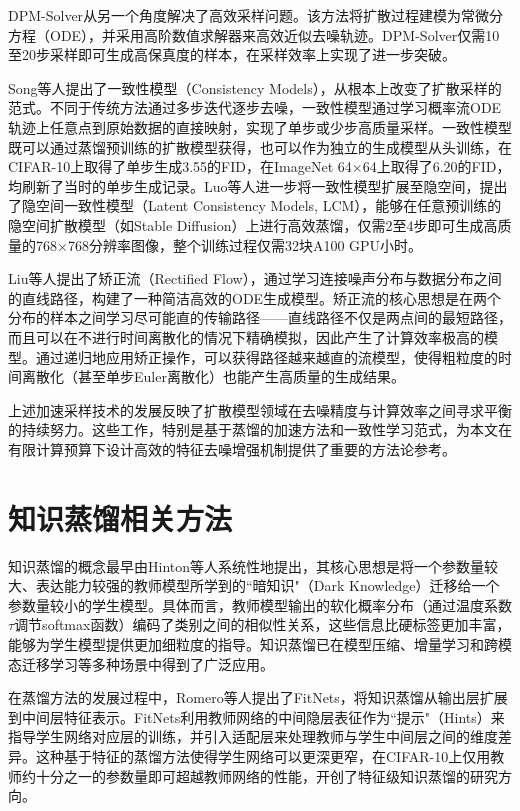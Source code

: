 DPM-Solver\cite{lu2022dpm}从另一个角度解决了高效采样问题。该方法将扩散过程建模为常微分方程（ODE），并采用高阶数值求解器来高效近似去噪轨迹。DPM-Solver仅需10至20步采样即可生成高保真度的样本，在采样效率上实现了进一步突破。

Song等人\cite{song2023consistency}提出了一致性模型（Consistency Models），从根本上改变了扩散采样的范式。不同于传统方法通过多步迭代逐步去噪，一致性模型通过学习概率流ODE轨迹上任意点到原始数据的直接映射，实现了单步或少步高质量采样。一致性模型既可以通过蒸馏预训练的扩散模型获得，也可以作为独立的生成模型从头训练，在CIFAR-10上取得了单步生成3.55的FID，在ImageNet 64$\times$64上取得了6.20的FID，均刷新了当时的单步生成记录。Luo等人\cite{luo2023latent}进一步将一致性模型扩展至隐空间，提出了隐空间一致性模型（Latent Consistency Models, LCM），能够在任意预训练的隐空间扩散模型（如Stable Diffusion）上进行高效蒸馏，仅需2至4步即可生成高质量的768$\times$768分辨率图像，整个训练过程仅需32块A100 GPU小时。

Liu等人\cite{liu2022rectified}提出了矫正流（Rectified Flow），通过学习连接噪声分布与数据分布之间的直线路径，构建了一种简洁高效的ODE生成模型。矫正流的核心思想是在两个分布的样本之间学习尽可能直的传输路径——直线路径不仅是两点间的最短路径，而且可以在不进行时间离散化的情况下精确模拟，因此产生了计算效率极高的模型。通过递归地应用矫正操作，可以获得路径越来越直的流模型，使得粗粒度的时间离散化（甚至单步Euler离散化）也能产生高质量的生成结果。

上述加速采样技术的发展反映了扩散模型领域在去噪精度与计算效率之间寻求平衡的持续努力。这些工作，特别是基于蒸馏的加速方法和一致性学习范式，为本文在有限计算预算下设计高效的特征去噪增强机制提供了重要的方法论参考。

\section{知识蒸馏相关方法}

知识蒸馏的概念最早由Hinton等人\cite{hinton2015distilling}系统性地提出，其核心思想是将一个参数量较大、表达能力较强的教师模型所学到的``暗知识"（Dark Knowledge）迁移给一个参数量较小的学生模型。具体而言，教师模型输出的软化概率分布（通过温度系数$\tau$调节softmax函数）编码了类别之间的相似性关系，这些信息比硬标签更加丰富，能够为学生模型提供更加细粒度的指导。知识蒸馏已在模型压缩、增量学习和跨模态迁移学习等多种场景中得到了广泛应用。

在蒸馏方法的发展过程中，Romero等人\cite{romero2015fitnets}提出了FitNets，将知识蒸馏从输出层扩展到中间层特征表示。FitNets利用教师网络的中间隐层表征作为``提示"（Hints）来指导学生网络对应层的训练，并引入适配层来处理教师与学生中间层之间的维度差异。这种基于特征的蒸馏方法使得学生网络可以更深更窄，在CIFAR-10上仅用教师约十分之一的参数量即可超越教师网络的性能，开创了特征级知识蒸馏的研究方向。

